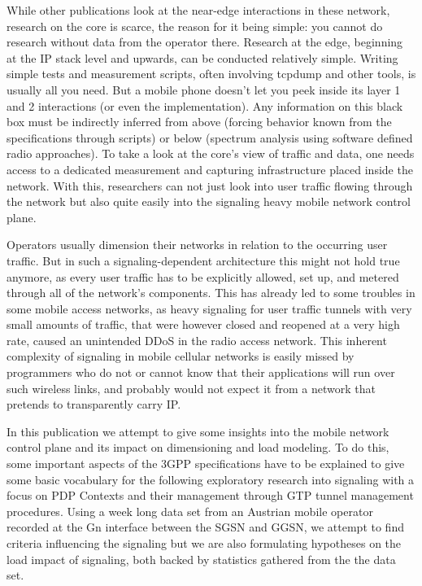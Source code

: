 While other publications look at the near-edge interactions in these network, research on the core is scarce, the reason for it being simple: you cannot do research without data from the operator there. Research at the edge, beginning at the IP stack level and upwards, can be conducted relatively simple. Writing simple tests and measurement scripts, often involving tcpdump and other tools, is usually all you need. But a mobile phone doesn't let you peek inside its layer 1 and 2 interactions (or even the implementation). Any information on this black box must be indirectly inferred from above (forcing behavior known from the specifications through scripts) or below (spectrum analysis using software defined radio approaches). To take a look at the core's view of traffic and data, one needs access to a dedicated measurement and capturing infrastructure placed inside the network. With this, researchers can not just look into user traffic flowing through the network but also quite easily into the signaling heavy mobile network control plane. 

Operators usually dimension their networks in relation to the occurring user traffic. But in such a signaling-dependent architecture this might not hold true anymore, as every user traffic has to be explicitly allowed, set up, and metered through all of the network's components. This has already led to some troubles in some mobile access networks, as heavy signaling for user traffic tunnels with very small amounts of traffic, that were however closed and reopened at a very high rate, caused an unintended \ac{DDoS} in the radio access network\cite{lt2012docostorm, it2011birdandroid}. 
This inherent complexity of signaling in mobile cellular networks is easily missed by programmers who do not or cannot know that their applications will run over such wireless links, and probably would not expect it from a network that pretends to transparently carry IP.

In this publication we attempt to give some insights into the mobile network control plane and its impact on dimensioning and load modeling. To do this, some important aspects of the \ac{3GPP} specifications have to be explained to give some basic vocabulary for the following exploratory research into signaling with a focus on \ac{PDP} Contexts and their management through \ac{GTP} tunnel management procedures. Using a week long data set from an Austrian mobile operator recorded at the Gn interface between the \ac{SGSN} and \ac{GGSN}, we attempt to find criteria influencing the signaling but we are also formulating hypotheses on the load impact of signaling, both backed by statistics gathered from the the data set.\\



